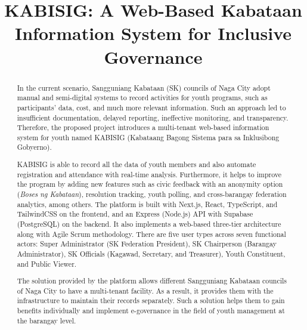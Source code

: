 \documentclass[oneside]{etd}
\title{KABISIG: A Web-Based Kabataan Information System for Inclusive Governance}
\begin{document}
\nocite{A,B,C,D,E,F,G,H,I,J,K,L,M,N,O,P,Q,R,S,T,U,V,W,X,Y,Z,
        AA,AB,AC,AD,AE,AF,AG,AH,AI,AJ,AK,AL,AM,AN,AO,AP,AQ,AR,AS,AT,
        AU,AV,AW,AX,AY,AZ,BA,BB,BC}
\maketitle
\makerecomm
\makeacceptance
\makedeclaration


\begin{abstract}
	\hspace*{\parindent}In the current scenario, Sangguniang Kabataan (SK) councils of Naga City adopt manual and semi-digital systems to record activities for youth programs, such as participants' data, cost, and much more relevant information. Such an approach led to insufficient documentation, delayed reporting, ineffective monitoring, and transparency. Therefore, the proposed project introduces a multi-tenant web-based information system for youth named KABISIG (Kabataang Bagong Sistema para sa Inklusibong Gobyerno).\vspace{5mm} 
    
    \hspace*{\parindent}KABISIG is able to record all the data of youth members and also automate registration and attendance with real-time analysis. Furthermore, it helps to improve the program by adding new features such as civic feedback with an anonymity option (\textit{Boses ng Kabataan}), resolution tracking, youth polling, and cross-barangay federation analytics, among others. The platform is built with Next.js, React, TypeScript, and TailwindCSS on the frontend, and an Express (Node.js) API with Supabase (PostgreSQL) on the backend. It also implements a web-based three-tier architecture along with Agile Scrum methodology. There are five user types across seven functional actors: Super Administrator (SK Federation President), SK Chairperson (Barangay Administrator), SK Officials (Kagawad, Secretary, and Treasurer), Youth Constituent, and Public Viewer.\vspace{5mm}
    
    \hspace*{\parindent}The solution provided by the platform allows different Sangguniang Kabataan councils of Naga City to have a multi-tenant facility. As a result, it provides them with the infrastructure to maintain their records separately. Such a solution helps them to gain benefits individually and implement e-governance in the field of youth management at the barangay level.\vspace{5mm}
\end{abstract}
\end{document}
